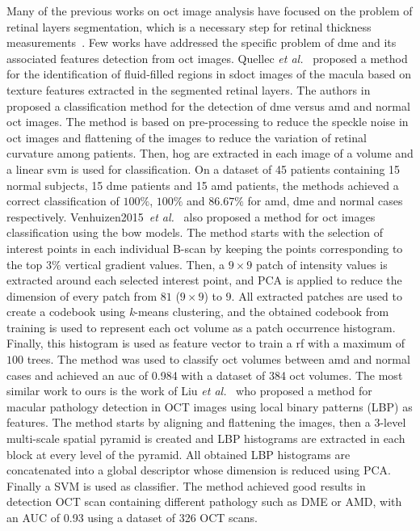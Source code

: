 Many of the previous works on \ac{oct} image analysis have focused on the problem of retinal layers segmentation, which is a necessary step for retinal thickness measurements~\cite{Chiu2010,Kafieh2013}.
Few works have addressed the specific problem of \ac{dme} and its associated features detection from \ac{oct} images. Quellec \textit{et al.}~\cite{Quellec2010} proposed a method for the identification of fluid-filled regions in \ac{sdoct} images of the macula based on texture features extracted in the segmented retinal layers.
The authors in~\cite{Srinivasan2014} proposed a classification method for the detection of \ac{dme} versus \ac{amd} and normal \ac{oct} images. The method is based on pre-processing to reduce the speckle noise in \ac{oct} images and flattening of the images to reduce the variation of retinal curvature among patients. Then, \ac{hog} are extracted in each image of a volume and a linear \ac{svm} is used for classification. On a dataset of 45 patients containing 15 normal subjects, 15 \ac{dme} patients and 15 \ac{amd} patients, the methods achieved a correct classification of $100 \%$, $100 \%$ and $86.67 \%$ for \ac{amd}, \ac{dme} and normal cases respectively. 
Venhuizen2015~\textit{et al.}~\cite{Venhuizen2015} also proposed a method for \ac{oct} images classification using the \ac{bow} models.
The method starts with the selection of interest points in each individual B-scan by keeping the points corresponding to the top $3 \%$ vertical gradient values. Then, a $ 9\times 9$ patch of intensity values is extracted around each selected interest point, and PCA is applied to reduce the dimension of every patch from $81$ ($9\times 9$) to $9$. 
All extracted patches are used to create a codebook using \textit{k}-means clustering, and the obtained codebook from training is used to represent each \ac{oct} volume as a patch occurrence histogram. Finally, this histogram is used as feature vector to train a \ac{rf} with a maximum of $100$ trees. The method was used to classify \ac{oct} volumes between \ac{amd} and normal cases and achieved an \ac{auc} of 0.984 with a dataset of 384 \ac{oct} volumes. 
The most similar work to ours is the work of Liu \textit{et al.}~\cite{Liu2011} who proposed a method for macular pathology detection in OCT images using local binary patterns (LBP) as features.
The method starts by aligning and flattening the images, then a 3-level multi-scale spatial pyramid is created and LBP histograms are extracted in each block at every level of the pyramid. All obtained LBP histograms are concatenated into a global descriptor whose dimension is reduced using PCA. Finally a SVM is used as classifier. The method achieved good results in detection OCT scan containing different pathology such as DME or AMD, with an AUC of 0.93 using a dataset of 326 OCT scans.  


